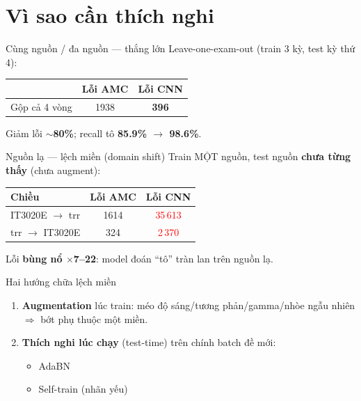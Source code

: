 \documentclass{beamer}
\newcommand{\hl}[1]{\textbf{#1}}
\begin{document}
\section{Vì sao cần thích nghi}

\begin{frame}{Cùng nguồn / đa nguồn --- thắng lớn}
Leave-one-exam-out (train 3 kỳ, test kỳ thứ 4):
\begin{center}
\begin{tabular}{|l|c|c|}
\hline
 & \textbf{Lỗi AMC} & \textbf{Lỗi CNN} \\
\hline
Gộp cả 4 vòng & 1938 & \hl{396} \\
\hline
\end{tabular}
\end{center}
\vspace{0.2cm}
Giảm lỗi $\sim$\hl{80\%}; recall tô \hl{85.9\% $\to$ 98.6\%}.
\end{frame}

\begin{frame}{Nguồn lạ --- lệch miền (domain shift)}
Train MỘT nguồn, test nguồn \hl{chưa từng thấy} (chưa augment):
\begin{center}
\begin{tabular}{|l|c|c|}
\hline
\textbf{Chiều} & \textbf{Lỗi AMC} & \textbf{Lỗi CNN} \\
\hline
IT3020E $\to$ trr & 1614 & \textcolor{red}{35\,613} \\
\hline
trr $\to$ IT3020E & 324 & \textcolor{red}{2\,370} \\
\hline
\end{tabular}
\end{center}
\vspace{0.2cm}
Lỗi \hl{bùng nổ $\times$7--22}: model đoán ``tô'' tràn lan trên nguồn lạ.
\end{frame}

\begin{frame}{Hai hướng chữa lệch miền}
\begin{enumerate}
    \item \hl{Augmentation} lúc train: méo độ sáng/tương phản/gamma/nhòe ngẫu nhiên $\Rightarrow$ bớt phụ thuộc một miền.
    \item \hl{Thích nghi lúc chạy} (test-time) trên chính batch đề mới:
    \begin{itemize}
        \item AdaBN
        \item Self-train (nhãn yếu)
    \end{itemize}
\end{enumerate}
\vspace{0.2cm}
\end{frame}
\end{document}
